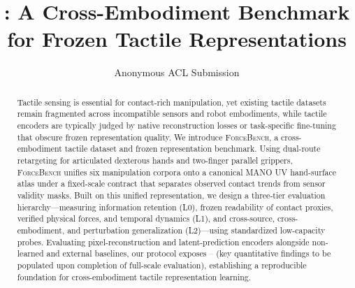 \documentclass[11pt]{article}
\title{\bench{}: A Cross-Embodiment Benchmark for Frozen Tactile Representations}
\author{Anonymous ACL Submission}
\newcommand{\bench}{\textsc{ForceBench}}
\newcommand{\tbd}{\textcolor{gray}{--}}
\begin{document}
\maketitle

\begin{abstract}
Tactile sensing is essential for contact-rich manipulation, yet existing tactile datasets remain fragmented across incompatible sensors and robot embodiments, while tactile encoders are typically judged by native reconstruction losses or task-specific fine-tuning that obscure frozen representation quality.
We introduce \bench{}, a cross-embodiment tactile dataset and frozen representation benchmark.
Using dual-route retargeting for articulated dexterous hands and two-finger parallel grippers, \bench{} unifies six manipulation corpora onto a canonical MANO UV hand-surface atlas under a fixed-scale contract that separates observed contact trends from sensor validity masks.
Built on this unified representation, we design a three-tier evaluation hierarchy---measuring information retention (L0), frozen readability of contact proxies, verified physical forces, and temporal dynamics (L1), and cross-source, cross-embodiment, and perturbation generalization (L2)---using standardized low-capacity probes.
Evaluating pixel-reconstruction and latent-prediction encoders alongside non-learned and external baselines, our protocol exposes \tbd{} (key quantitative findings to be populated upon completion of full-scale evaluation), establishing a reproducible foundation for cross-embodiment tactile representation learning.
\end{abstract}










\appendix

\end{document}
